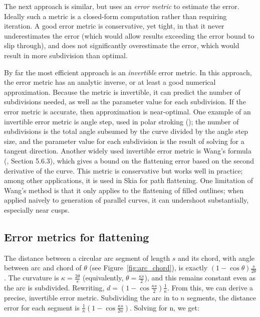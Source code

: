 \documentclass[sigconf]{acmart}
\begin{document}

The next approach is similar, but uses an \emph{error metric} to estimate the error. Ideally such a metric is a closed-form computation rather than requiring iteration. A good error metric is conservative, yet tight, in that it never underestimates the error (which would allow results exceeding the error bound to slip through), and does not significantly overestimate the error, which would result in more subdivision than optimal.

By far the most efficient approach is an \emph{invertible} error metric. In this approach, the error metric has an analytic inverse, or at least a good numerical approximation. Because the metric is invertible, it can predict the number of subdivisions needed, as well as the parameter value for each subdivision. If the error metric is accurate, then approximation is near-optimal. One example of an invertible error metric is angle step, used in polar stroking (\citet{Kilgard2020}); the number of subdivisions is the total angle subsumed by the curve divided by the angle step size, and the parameter value for each subdivision is the result of solving for a tangent direction. Another widely used invertible error metric is Wang's formula (\citet{Goldman2003}, Section 5.6.3), which gives a bound on the flattening error based on the second derivative of the curve. This metric is conservative but works well in practice; among other applications, it is used in Skia for path flattening. One limitation of Wang's method is that it only applies to the flattening of filled outlines; when applied naively to generation of parallel curves, it can undershoot substantially, especially near cusps.


\subsection{Error metrics for flattening}

The distance between a circular arc segment of length $s$ and its chord, with angle between arc and chord of $\theta$ (see Figure~\ref{fig:arc_chord}), is exactly $(1-\cos \theta)\frac{s}{2\theta}$. The curvature is $\kappa = \frac{2\theta}{s}$ (equivalently, $\theta = \frac{\kappa s}{2}$), and this remains constant even as the arc is subdivided. Rewriting, $d = (1-\cos\frac{\kappa s}{2})\frac{1}{\kappa}$. From this, we can derive a precise, invertible error metric. Subdividing the arc in to $n$ segments, the distance error for each segment is $\frac{1}{\kappa}(1-\cos \frac{\kappa s}{2n})$. Solving for n, we get:
\end{document}
